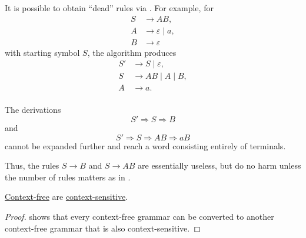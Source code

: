 \begin{example}
\begin{thmenum}
     It is possible to obtain \enquote{dead} rules via . For example, for
    \begin{equation*}
      \begin{aligned}
        S &\to A B, \\
        A &\to \varepsilon \mid a, \\
        B &\to \varepsilon
      \end{aligned}
    \end{equation*}
    with starting symbol \( S \), the algorithm produces
    \begin{equation*}
      \begin{aligned}
        S' &\to S \mid \varepsilon, \\
        S &\to A B \mid A \mid B, \\
        A &\to a. \\
      \end{aligned}
    \end{equation*}

    The derivations
    \begin{equation*}
      S' \Rightarrow S \Rightarrow B
    \end{equation*}
    and
    \begin{equation*}
      S' \Rightarrow S \Rightarrow A B \Rightarrow a B
    \end{equation*}
    cannot be expanded further and reach a word consisting entirely of terminals.

    Thus, the rules \( S \to B \) and \( S \to A B \) are essentially useless, but do no harm unless the number of rules matters as in .
  \end{thmenum}
\end{example}

\begin{proposition}\label{thm:context_free_languages_are_conext_sensitive}
  \hyperref[def:chomsky_hierarchy/context_free]{Context-free}  are \hyperref[def:chomsky_hierarchy/context_sensitive]{context-sensitive}.
\end{proposition}
\begin{proof}
   shows that every context-free grammar can be converted to another context-free grammar that is also context-sensitive.
\end{proof}


